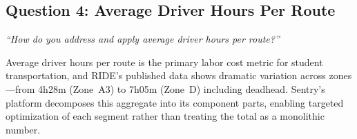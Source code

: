 \subsection{Question 4: Average Driver Hours Per Route}
\textit{``How do you address and apply average driver hours per route?''}

\vspace{0.3cm}

Average driver hours per route is the primary labor cost metric for student transportation, and RIDE's published data shows dramatic variation across zones---from 4h28m (Zone~A3) to 7h05m (Zone~D) including deadhead. Sentry's platform decomposes this aggregate into its component parts, enabling targeted optimization of each segment rather than treating the total as a monolithic number.

